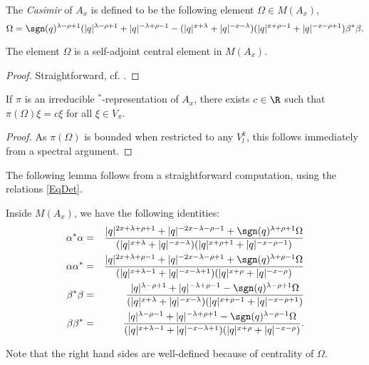 \begin{Def} The \emph{Casimir} of $A_x$ is defined to be the following element $\Omega\in M(A_x)$, \[\Omega = \sgn(q)^{\lambda-\rho+1}(|q|^{\lambda-\rho+1}+|q|^{-\lambda+\rho-1} - (|q|^{x+\lambda}+|q|^{-x-\lambda})(|q|^{x+\rho-1}+|q|^{-x-\rho+1})\beta^*\beta.\] 
\end{Def}

\begin{Lem} The element $\Omega$ is a self-adjoint central element in $M(A_x)$.
\end{Lem}
\begin{proof}
Straightforward, cf. \cite[Lemma 3.3]{KoR1}.
\end{proof}

\begin{Cor}\label{CorCas} If $\pi$ is an irreducible $^*$-representation of $A_x$, there exists $c\in \R$ such that $\pi(\Omega)\xi = c\xi$ for all $\xi \in V_{\pi}$. 
\end{Cor} 
\begin{proof} As $\pi(\Omega)$ is bounded when restricted to any $V^k_l$, this follows immediately from a spectral argument. 
\end{proof} 

The following lemma follows from a straightforward computation, using the relations \eqref{EqDet}.

\begin{Lem}\label{LemAmp} Inside $M(A_x)$, we have the following identities:
\begin{eqnarray*}
\alpha^*\alpha &=& \frac{|q|^{2x+\lambda+\rho+1}+|q|^{-2x-\lambda-\rho-1}+\sgn(q)^{\lambda+\rho+1}\Omega}{(|q|^{x+\lambda}+|q|^{-x-\lambda})(|q|^{x+\rho+1}+|q|^{-x-\rho-1})}\\
\alpha\alpha^* &=& \frac{|q|^{2x+\lambda+\rho-1}+|q|^{-2x-\lambda-\rho+1}+\sgn(q)^{\lambda+\rho-1}\Omega}{(|q|^{x+\lambda-1}+|q|^{-x-\lambda+1})(|q|^{x+\rho}+|q|^{-x-\rho})}\\
\beta^*\beta &=& \frac{|q|^{\lambda-\rho+1}+|q|^{-\lambda+\rho-1}-\sgn(q)^{\lambda-\rho+1}\Omega}{(|q|^{x+\lambda}+|q|^{-x-\lambda})(|q|^{x+\rho-1}+|q|^{-x-\rho+1})}\\
\beta\beta^* &=&  \frac{|q|^{\lambda-\rho-1}+|q|^{-\lambda+\rho+1}-\sgn(q)^{\lambda-\rho-1}\Omega}{(|q|^{x+\lambda-1}+|q|^{-x-\lambda+1})(|q|^{x+\rho}+|q|^{-x-\rho})}.
\end{eqnarray*}
\end{Lem}

Note that the right hand sides are well-defined because of centrality of $\Omega$.

